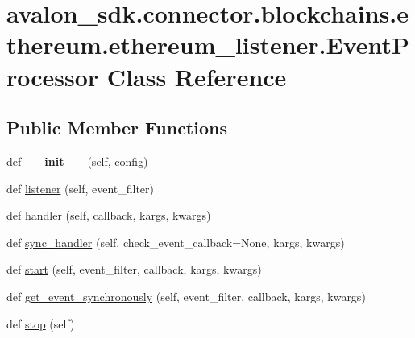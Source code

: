 \hypertarget{classavalon__sdk_1_1connector_1_1blockchains_1_1ethereum_1_1ethereum__listener_1_1EventProcessor}{}\section{avalon\+\_\+sdk.\+connector.\+blockchains.\+ethereum.\+ethereum\+\_\+listener.\+Event\+Processor Class Reference}
\label{classavalon__sdk_1_1connector_1_1blockchains_1_1ethereum_1_1ethereum__listener_1_1EventProcessor}
\subsection*{Public Member Functions}
\begin{DoxyCompactItemize}
\item 
\mbox{\label{classavalon__sdk_1_1connector_1_1blockchains_1_1ethereum_1_1ethereum__listener_1_1EventProcessor_a80aa45b678ea86d2e9dd0a7c7527b4d4}} 
def {\bfseries \+\_\+\+\_\+init\+\_\+\+\_\+} (self, config)
\item 
def \hyperlink{classavalon__sdk_1_1connector_1_1blockchains_1_1ethereum_1_1ethereum__listener_1_1EventProcessor_afa664b1557bdb9ff2be3ca958ad6904e}{listener} (self, event\+\_\+filter)
\item 
def \hyperlink{classavalon__sdk_1_1connector_1_1blockchains_1_1ethereum_1_1ethereum__listener_1_1EventProcessor_a332ae0d71653f763026ffcca21d21ed9}{handler} (self, callback, kargs, kwargs)
\item 
def \hyperlink{classavalon__sdk_1_1connector_1_1blockchains_1_1ethereum_1_1ethereum__listener_1_1EventProcessor_ae4c4f72721dbd17195d60f297fcf49f0}{sync\+\_\+handler} (self, check\+\_\+event\+\_\+callback=None, kargs, kwargs)
\item 
def \hyperlink{classavalon__sdk_1_1connector_1_1blockchains_1_1ethereum_1_1ethereum__listener_1_1EventProcessor_ab3046a58ea849120a1f05c9ffe5ef45b}{start} (self, event\+\_\+filter, callback, kargs, kwargs)
\item 
def \hyperlink{classavalon__sdk_1_1connector_1_1blockchains_1_1ethereum_1_1ethereum__listener_1_1EventProcessor_a2fcd9af61d8bf77c138e01d9b9f5c8ba}{get\+\_\+event\+\_\+synchronously} (self, event\+\_\+filter, callback, kargs, kwargs)
\item 
def \hyperlink{classavalon__sdk_1_1connector_1_1blockchains_1_1ethereum_1_1ethereum__listener_1_1EventProcessor_a5600b4f919553e0af5177422ba0ce6fd}{stop} (self)
\end{DoxyCompactItemize}
